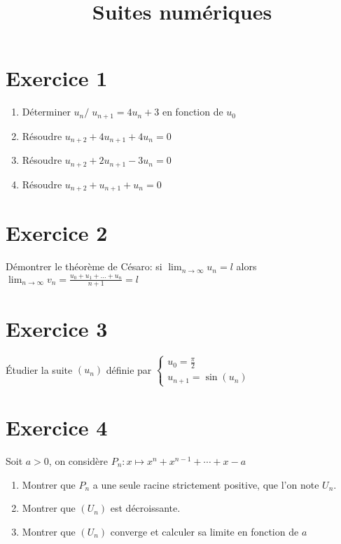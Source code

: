 \documentclass[11pt]{article}
\author{\Name \texttt{\Login}}
\date{}
\title{Suites numériques}
\begin{document}
\maketitle


\section*{Exercice 1}

\begin{enumerate}

\item Déterminer $u_n /\; u_{n+1}=4u_n +3$ en fonction de $u_0$
\item Résoudre $u_{n+2}+4u_{n+1}+4u_n=0$
\item Résoudre $u_{n+2}+2u_{n+1}-3u_n=0$
\item Résoudre $u_{n+2}+u_{n+1}+u_n=0$
\end{enumerate}

\section*{Exercice 2}

Démontrer le théorème de Césaro: si $\lim_{n\to\infty} u_n= l$ alors $\lim_{n\to\infty} v_n=\frac{u_0+u_1+\dots+u_n}{n+1}=l$ 

\section*{Exercice 3}

Étudier la suite $(u_n)$ définie par 
$\begin{cases}
u_0=\frac{\pi}{2}\\
u_{n+1}=\sin(u_n)
\end{cases}$

\section*{Exercice 4}

Soit $a>0$, on considère $P_n : x  \mapsto x^n + x^{n-1}+\cdots + x - a$

\begin{enumerate}

\item Montrer que $P_n$ a une seule racine strictement positive, que l'on note $U_n$.
\item Montrer que $(U_n)$ est décroissante.
\item Montrer que $(U_n)$ converge et calculer sa limite en fonction de $a$
\end{enumerate}
\end{document}
